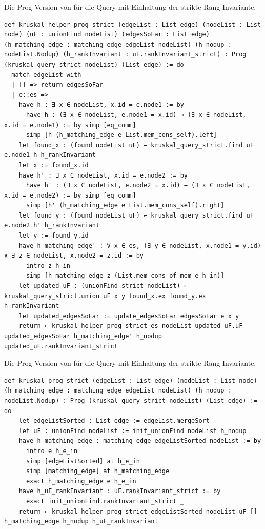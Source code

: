 \begin{definition}[\Kruskalkruskalhelperprogstrict]
  Die Prog-Version von \Kruskalkruskalhelper für die Query \Kruskalkruskalquerystrict mit Einhaltung der strikte Rang-Invariante.
\end{definition}
\begin{lstlisting}
def kruskal_helper_prog_strict (edgeList : List edge) (nodeList : List node) (uF : unionFind nodeList) (edgesSoFar : List edge) (h_matching_edge : matching_edge edgeList nodeList) (h_nodup : nodeList.Nodup) (h_rankInvariant : uF.rankInvariant_strict) : Prog (kruskal_query_strict nodeList) (List edge) := do
  match edgeList with
  | [] => return edgesSoFar
  | e::es =>
    have h : ∃ x ∈ nodeList, x.id = e.node1 := by
      have h : (∃ x ∈ nodeList, e.node1 = x.id) → (∃ x ∈ nodeList, x.id = e.node1) := by simp [eq_comm]
      simp [h (h_matching_edge e List.mem_cons_self).left]
    let found_x : (found nodeList uF) ← kruskal_query_strict.find uF e.node1 h h_rankInvariant
    let x := found_x.id
    have h' : ∃ x ∈ nodeList, x.id = e.node2 := by
      have h' : (∃ x ∈ nodeList, e.node2 = x.id) → (∃ x ∈ nodeList, x.id = e.node2) := by simp [eq_comm]
      simp [h' (h_matching_edge e List.mem_cons_self).right]
    let found_y : (found nodeList uF) ← kruskal_query_strict.find uF e.node2 h' h_rankInvariant
    let y := found_y.id
    have h_matching_edge' : ∀ x ∈ es, (∃ y ∈ nodeList, x.node1 = y.id) ∧ ∃ z ∈ nodeList, x.node2 = z.id := by
      intro z h_in
      simp [h_matching_edge z (List.mem_cons_of_mem e h_in)]
    let updated_uF : (unionFind_strict nodeList) ← kruskal_query_strict.union uF x y found_x.ex found_y.ex h_rankInvariant
    let updated_edgesSoFar := update_edgesSoFar edgesSoFar e x y
    return ← kruskal_helper_prog_strict es nodeList updated_uF.uF updated_edgesSoFar h_matching_edge' h_nodup updated_uF.rankInvariant_strict
\end{lstlisting}

\begin{definition}[\Kruskalkruskalprogstrict]
  Die Prog-Version von \Kruskalkruskal für die Query \Kruskalkruskalquerystrict mit Einhaltung der strikte Rang-Invariante.
\end{definition}
\begin{lstlisting}
def kruskal_prog_strict (edgeList : List edge) (nodeList : List node) (h_matching_edge : matching_edge edgeList nodeList) (h_nodup : nodeList.Nodup) : Prog (kruskal_query_strict nodeList) (List edge) := do
    let edgeListSorted : List edge := edgeList.mergeSort
    let uF : unionFind nodeList := init_unionFind nodeList h_nodup
    have h_matching_edge : matching_edge edgeListSorted nodeList := by
      intro e h_e_in
      simp [edgeListSorted] at h_e_in
      simp [matching_edge] at h_matching_edge
      exact h_matching_edge e h_e_in
    have h_uF_rankInvariant : uF.rankInvariant_strict := by
      exact init_unionFind.rankInvariant_strict _
    return ← kruskal_helper_prog_strict edgeListSorted nodeList uF [] h_matching_edge h_nodup h_uF_rankInvariant
\end{lstlisting}

